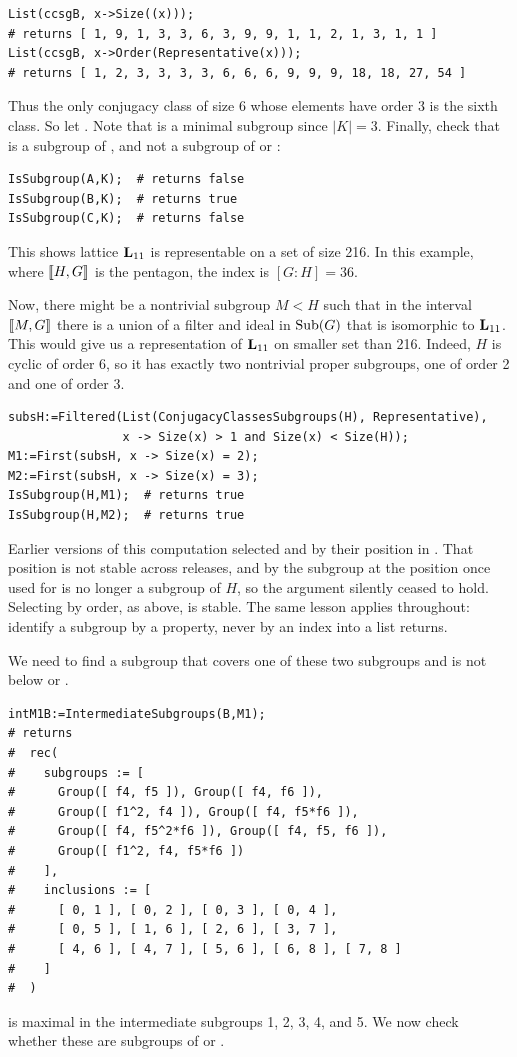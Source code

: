{\small 
\begin{verbatim}
List(ccsgB, x->Size((x)));
# returns [ 1, 9, 1, 3, 3, 6, 3, 9, 9, 1, 1, 2, 1, 3, 1, 1 ]
List(ccsgB, x->Order(Representative(x)));
# returns [ 1, 2, 3, 3, 3, 3, 6, 6, 6, 9, 9, 9, 18, 18, 27, 54 ]
\end{verbatim}
}
Thus the only conjugacy class of size 6 whose elements 
have order 3 is the sixth class.  So let
.
Note that  is a minimal subgroup since $|K|=3$.  Finally,
check that  is a subgroup of , and not a subgroup of
 or :
{\small 
\begin{verbatim}
IsSubgroup(A,K);  # returns false
IsSubgroup(B,K);  # returns true
IsSubgroup(C,K);  # returns false
\end{verbatim}
}
This shows lattice $\mathbf{L}_{11}$ is representable on a set of size 216.
In this example, where $\llbracket H,G \rrbracket$ is the pentagon, the index is $[G:H]=36$.  

Now, there might be a nontrivial subgroup $M < H$ such that in the interval
$\llbracket M, G \rrbracket$ there is a union of a filter and ideal in $\operatorname{Sub}(G)$ that is isomorphic to
$\mathbf{L}_{11}$. This would give us a representation of $\mathbf{L}_{11}$ on smaller set than 216.
Indeed, $H$ is cyclic of order 6, so it has exactly two nontrivial proper
subgroups, one of order 2 and one of order 3.

{\small 
\begin{verbatim}
subsH:=Filtered(List(ConjugacyClassesSubgroups(H), Representative),
                x -> Size(x) > 1 and Size(x) < Size(H));
M1:=First(subsH, x -> Size(x) = 2);
M2:=First(subsH, x -> Size(x) = 3);
IsSubgroup(H,M1);  # returns true
IsSubgroup(H,M2);  # returns true
\end{verbatim}
}
\begin{remark}
Earlier versions of this computation selected  and  by
their position in .  That position is
not stable across \gap releases, and by  the subgroup at the
position once used for  is no longer a subgroup of $H$, so the
argument silently ceased to hold.  Selecting by order, as above, is
stable.  The same lesson applies throughout: identify a subgroup by a
property, never by an index into a list \gap returns.
\end{remark}
We need to find a subgroup that covers one of these two subgroups
and is not below  or .
{\small 
\begin{verbatim}
intM1B:=IntermediateSubgroups(B,M1);
# returns 
#  rec( 
#    subgroups := [ 
#      Group([ f4, f5 ]), Group([ f4, f6 ]), 
#      Group([ f1^2, f4 ]), Group([ f4, f5*f6 ]), 
#      Group([ f4, f5^2*f6 ]), Group([ f4, f5, f6 ]), 
#      Group([ f1^2, f4, f5*f6 ]) 
#    ], 
#    inclusions := [ 
#      [ 0, 1 ], [ 0, 2 ], [ 0, 3 ], [ 0, 4 ], 
#      [ 0, 5 ], [ 1, 6 ], [ 2, 6 ], [ 3, 7 ], 
#      [ 4, 6 ], [ 4, 7 ], [ 5, 6 ], [ 6, 8 ], [ 7, 8 ] 
#    ] 
#  )
\end{verbatim}
}
 is maximal in the intermediate subgroups 1, 2, 3, 4, and 5.
We now check whether these are subgroups of  or .

